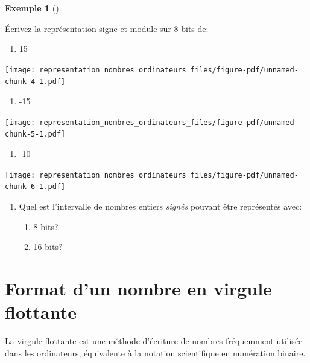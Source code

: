 \documentclass[
  letterpaper,
]{scrbook}
\providecommand{\tightlist}{%
  \setlength{\itemsep}{0pt}\setlength{\parskip}{0pt}}\usepackage{longtable,booktabs,array}
\theoremstyle{plain}
\theoremstyle{definition}
\theoremstyle{definition}
\newtheorem{example}{Exemple}[chapter]
\theoremstyle{remark}
\begin{document}
\begin{example}[]\protect\hypertarget{exm-representation-signe-module-8-bits}{}\label{exm-representation-signe-module-8-bits}

Écrivez la représentation signe et module sur 8 bits de:

\begin{enumerate}
\def\labelenumi{\alph{enumi})}
\tightlist
\item
  15
\end{enumerate}

\texttt{[image: representation\_nombres\_ordinateurs\_files/figure-pdf/unnamed-chunk-4-1.pdf]}

\begin{enumerate}
\def\labelenumi{\alph{enumi})}
\tightlist
\item
  -15
\end{enumerate}

\texttt{[image: representation\_nombres\_ordinateurs\_files/figure-pdf/unnamed-chunk-5-1.pdf]}

\begin{enumerate}
\def\labelenumi{\alph{enumi})}
\tightlist
\item
  -10
\end{enumerate}

\texttt{[image: representation\_nombres\_ordinateurs\_files/figure-pdf/unnamed-chunk-6-1.pdf]}

\begin{enumerate}
\def\labelenumi{\alph{enumi})}
\tightlist
\item
  Quel est l'intervalle de nombres entiers \emph{signés} pouvant être
  représentés avec:

  \begin{enumerate}
  \def\labelenumii{\roman{enumii}.}
  \tightlist
  \item
    8 bits?
  \item
    16 bits?
  \end{enumerate}
\end{enumerate}

\end{example}

\hypertarget{format-dun-nombre-en-virgule-flottante}{%
\section{Format d'un nombre en virgule
flottante}\label{format-dun-nombre-en-virgule-flottante}}

La virgule flottante est une méthode d'écriture de nombres fréquemment
utilisée dans les ordinateurs, équivalente à la notation scientifique en
numération binaire.
\end{document}
